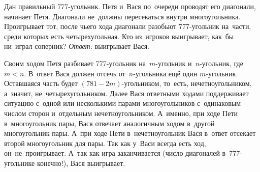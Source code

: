 \problem
Дан правильный $777$-угольник.
Петя и~Вася по~очереди проводят его диагонали, начинает Петя.
Диагонали не~должны пересекаться внутри многоугольника.
Проигрывает тот, после чьего хода диагонали разобьют 777-угольник на~части,
среди которых есть четырехугольная.
Кто из~игроков выигрывает, как~бы ни~играл соперник?
\solution
\emph{Ответ:} выигрывает Вася.
\par
Своим ходом Петя разбивает 777-угольник на~$m$-угольник и~$n$-угольник,
где $m < n$.
В~ответ Вася должен отсечь от~$n$-угольника ещё один $m$-угольник.
Оставшаяся часть будет $(781 - 2 m)$-угольником, то~есть, нечетноугольником,
а~значит, не~четырехугольником.
Далее Вася ответными ходами поддерживает ситуацию с~одной или несколькими
парами многоугольников с~одинаковым числом сторон и~отдельным
нечетноугольником.
А~именно, при ходе Пети в~многоугольник пары, Вася отвечает аналогичным ходом
в~другой многоугольник пары.
А~при ходе Пети в~нечетноугольник Вася в~ответ отсекает второй многоугольник
для пары.
Так как у~Васи всегда есть ход, он~не~проигрывает.
А~так как игра заканчивается (число диагоналей в~777-угольнике конечно!),
Вася выигрывает.
\endproblem
